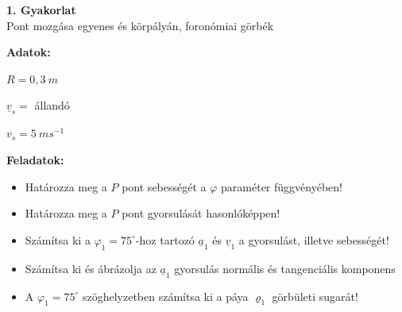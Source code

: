 \newpage
\begin{center}
    \large \textbf{1. Gyakorlat}\\
    Pont mozgása egyenes és körpályán, foronómiai görbék
\end{center}
\begin{tcolorbox}[colback=MidnightBlue!5!white,colframe=MidnightBlue!60!black,title= 1. Feladat]
    \textbf{Adatok:}
\begin{center}
    \begin{multicols}{3}
        \(R = 0,3\ m\)

        \columnbreak

        \(\underline{v}_s =\) állandó

        \columnbreak

        \(v_s = 5\ ms^{-1}\)
    \end{multicols}
\end{center}
\textbf{Feladatok:}
\begin{itemize}
    \item Határozza meg a \(P\) pont sebességét a $\varphi$ paraméter függvényében!
    \item Határozza meg a \(P\) pont gyorsulását hasonlóképpen!
    \item Számítsa ki a \(\varphi_1 = 75^{\circ}\)-hoz tartozó \(\underline{a}_1\) és \(\underline{v}_1\) a gyorsulást, illetve sebességét!
    \item Számítsa ki és ábrázolja az \(\underline{a}_1\) gyorsulás normális és tangenciális komponens
    \item A \(\varphi_1 = 75^{\circ}\) szöghelyzetben számítsa ki a páya \(\varrho_1\) görbületi sugarát!
\end{itemize}
\end{tcolorbox}
\begin{tcolorbox}[colback=MidnightBlue!5!white,colframe=MidnightBlue!60!black,title= 1. Feladat]
\end{tcolorbox}